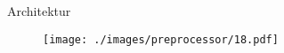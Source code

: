\begin{frame}{Architektur}
    \begin{figure}
    	\centering
    	\texttt{[image: ./images/preprocessor/18.pdf]}
    \end{figure}
\end{frame}
